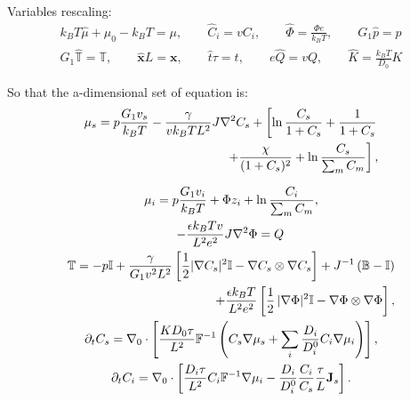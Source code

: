 Variables rescaling:
\begin{equation*}
\begin{aligned}
k_BT\hat{\mu} + \mu_0 -k_BT= \mu, \qquad \hat{C}_i = vC_i, \qquad \hat{\Phi} = \frac{\Phi e}{k_B T}, \qquad  G_1\hat{p}= p\\
G_1\hat{\mathbb{T}}=\mathbb{T}, \qquad\hat{\mathbf{x}} L =\mathbf{x}, \qquad \hat{t}\tau=t, \qquad e\hat{Q} =v Q, \qquad \hat{K} = \frac{k_BT}{D_0}K
\end{aligned}
\end{equation*}

So that the a-dimensional set of equation is:
\begin{gather}
\begin{aligned}
\mu_s = p \frac{G_1v_s}{k_BT} - \frac{\gamma}{vk_BT L^2} J \nabla^2 C_s + \left[\ln \frac{C_s}{1+C_s} + \frac{1}{1+C_s}\right.\\
\left.\ \ \ \ \ \ +\frac{\chi}{(1+C_s)^2} + \ln \frac{C_s}{\sum_m C_m} \right], 
\end{aligned}\\[2.5mm]
\mu_i = p \frac{G_1v_i}{k_BT} + \Phi z_i + \ln \frac{C_i}{\sum_m C_m} ,\\
-\frac{\epsilon k_B Tv}{L^2e^2} J \nabla^2 \Phi = Q\, \\
\begin{aligned}
\mathbb{T}= -p \mathbb{I} +\frac{\gamma }{G_1v^2L^2} \left[\frac{1}{2} |\nabla C_s|^2\mathbb{I} - \nabla C_s \otimes \nabla C_s\right]+ J^{-1}\left(\mathbb{B}-\mathbb{I}\right)\\
+ \frac{\epsilon k_BT}{L^2e^2} \left[\frac{1}{2} \,|\nabla \Phi|^2\mathbb{I} -\nabla \Phi \otimes \nabla \Phi\right],
\end{aligned}\\
\partial_t C_s=\nabla_0 \cdot\left[\frac{K D_0\tau}{L^2}  \mathbb{F}^{-1}\left(C_s\nabla \mu_s +\sum_i \frac{D_i}{D^0_i} C_i \nabla \mu_i\right)\right],\\
\partial_t C_i= \nabla_0\cdot\left[\frac{D_i\tau}{L^2}C_i\mathbb{F}^{-1}\nabla \mu_i -\frac{D_i}{D^0_i} \frac{C_i}{C_s} \frac{\tau}{L}\mathbf{J}_s\right].
\end{gather}

